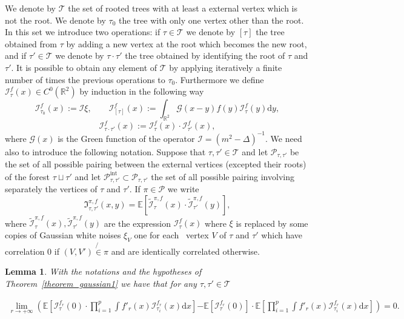 \documentclass[a4paper,10pt]{article}
\newcommand{\assign}{:=}
\newcommand{\mathd}{\mathrm{d}}
\newcommand{\tmop}[1]{\ensuremath{\operatorname{#1}}}
\newtheorem{lemma}[theorem]{Lemma}
\begin{document}
We denote by $\mathcal{T}$ the set of rooted trees with at least a external
vertex which is not the root. We denote by $\tau_0$ the tree with only one
vertex other than the root. In this set we introduce two operations: if $\tau
\in \mathcal{T}$ we denote by $[\tau]$ the tree obtained from $\tau$ by adding
a new vertex at the root which becomes the new root, and if $\tau' \in
\mathcal{T}$ we denote by $\tau \cdot \tau'$ the tree obtained by identifying
the root of $\tau$ and $\tau'$. It is possible to obtain any element of
$\mathcal{T}$ by applying iteratively a finite number of times the previous
operations to $\tau_0$. Furthermore we define $\mathcal{I}^f_{\tau} (x) \in
C^0 (\mathbb{R}^2)$ by induction in the following way
\[ \mathcal{I}^f_{\tau_0} (x) \assign \mathcal{I} \xi, \qquad
   \mathcal{I}^f_{[\tau]} (x) \assign \int_{\mathbb{R}^2} \mathcal{G} (x - y)
   f (y) \mathcal{I}^f_{\tau} (y) \mathd y, \]
\[ \mathcal{I}^f_{\tau \cdot \tau'} (x) \assign \mathcal{I}^f_{\tau} (x) \cdot
   \mathcal{I}^f_{\tau'} (x), \]
where $\mathcal{G} (x)$ is the Green function of the operator $\mathcal{I}=
(m^2 - \Delta)^{- 1}$. We need also to introduce the following notation.
Suppose that $\tau, \tau' \in \mathcal{T}$ and let $\mathcal{P}_{\tau, \tau'}$
be the set of all possible pairing between the external vertices (excepted
their roots) of the forest $\tau \sqcup \tau'$ and let
$\mathcal{P}^{\tmop{int}}_{\tau, \tau'} \subset \mathcal{P}_{\tau, \tau'}$ the
set of all possible pairing involving separately the vertices of $\tau$ and
$\tau'$. If $\pi \in \mathcal{P}$ we write
\[ \mathfrak{I}^{\pi, f}_{\tau, \tau'} (x, y) =\mathbb{E}
   [\widetilde{\mathcal{I}}^{\pi, f}_{\tau} (x) \cdot
   \widetilde{\mathcal{I}}^{\pi, f}_{\tau'} (y)], \]
where $\widetilde{\mathcal{I}}^{\pi, f}_{\tau} (x),
\widetilde{\mathcal{I}}^{\pi, f}_{\tau'} (y)$ are the expression
$\mathcal{I}^f_{\tau} (x)$ where $\xi$ is replaced by some copies of Gaussian
white noises $\xi_V$ one for each \ vertex $V$ of $\tau$ and $\tau'$ which
have correlation $0$ if $(V, V') \not{\in} \pi$ and are identically correlated
otherwise.

\begin{lemma}
  \label{lemma_gaussian1}With the notations and the hypotheses of
  Theorem~\ref{theorem_gaussian1} we have that for any $\tau, \tau' \in
  \mathcal{T}$
  
  \begin{multline*}
    \lim_{r \rightarrow + \infty} \left. \left( \mathbb{E} \left[
    \mathcal{I}^{f_r}_{\tau} (0) \cdot \prod_{i = 1}^p \int f'_r (x)
    \mathcal{I}^{f_r}_{\tau_i} (x) \mathd x \right] \right. \right.    \left. \left. -\mathbb{E} [\mathcal{I}^{f_r}_{\tau} (0)] \cdot \mathbb{E}
    \left[ \prod_{i = 1}^p \int f'_r (x) \mathcal{I}^{f_r}_{\tau_i} (x) \mathd
    x \right] \right) \right. = 0.
  \end{multline*}
\end{lemma}
\end{document}
